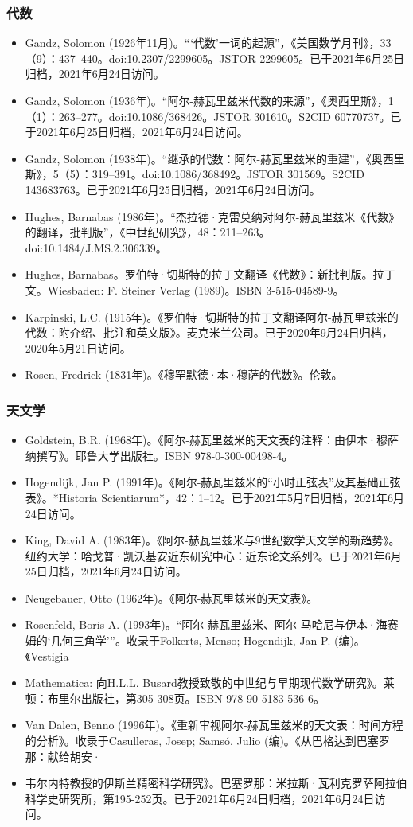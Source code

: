 \subsubsection{代数}  
\begin{itemize}
\item Gandz, Solomon (1926年11月)。“‘代数’一词的起源”，《美国数学月刊》，33（9）：437–440。doi:10.2307/2299605。JSTOR 2299605。已于2021年6月25日归档，2021年6月24日访问。  
\item Gandz, Solomon (1936年)。“阿尔-赫瓦里兹米代数的来源”，《奥西里斯》，1（1）：263–277。doi:10.1086/368426。JSTOR 301610。S2CID 60770737。已于2021年6月25日归档，2021年6月24日访问。  
\item Gandz, Solomon (1938年)。“继承的代数：阿尔-赫瓦里兹米的重建”，《奥西里斯》，5（5）：319–391。doi:10.1086/368492。JSTOR 301569。S2CID 143683763。已于2021年6月25日归档，2021年6月24日访问。  
\item Hughes, Barnabas (1986年)。“杰拉德·克雷莫纳对阿尔-赫瓦里兹米《代数》的翻译，批判版”，《中世纪研究》，48：211–263。doi:10.1484/J.MS.2.306339。  
\item Hughes, Barnabas。罗伯特·切斯特的拉丁文翻译《代数》：新批判版。拉丁文。Wiesbaden: F. Steiner Verlag (1989)。ISBN 3-515-04589-9。
\item Karpinski, L.C. (1915年)。《罗伯特·切斯特的拉丁文翻译阿尔-赫瓦里兹米的代数：附介绍、批注和英文版》。麦克米兰公司。已于2020年9月24日归档，2020年5月21日访问。  
\item Rosen, Fredrick (1831年)。《穆罕默德·本·穆萨的代数》。伦敦。
\end{itemize}
\subsubsection{天文学}  
\begin{itemize}
\item Goldstein, B.R. (1968年)。《阿尔-赫瓦里兹米的天文表的注释：由伊本·穆萨纳撰写》。耶鲁大学出版社。ISBN 978-0-300-00498-4。  
\item Hogendijk, Jan P. (1991年)。《阿尔-赫瓦里兹米的“小时正弦表”及其基础正弦表》。*Historia Scientiarum*，42：1–12。已于2021年5月7日归档，2021年6月24日访问。  
\item King, David A. (1983年)。《阿尔-赫瓦里兹米与9世纪数学天文学的新趋势》。纽约大学：哈戈普·凯沃基安近东研究中心：近东论文系列2。已于2021年6月25日归档，2021年6月24日访问。  
\item Neugebauer, Otto (1962年)。《阿尔-赫瓦里兹米的天文表》。  
\item Rosenfeld, Boris A. (1993年)。“阿尔-赫瓦里兹米、阿尔-马哈尼与伊本·海赛姆的‘几何三角学’”。收录于Folkerts, Menso; Hogendijk, Jan P. (编)。《Vestigia \item Mathematica: 向H.L.L. Busard教授致敬的中世纪与早期现代数学研究》。莱顿：布里尔出版社，第305-308页。ISBN 978-90-5183-536-6。  
\item Van Dalen, Benno (1996年)。《重新审视阿尔-赫瓦里兹米的天文表：时间方程的分析》。收录于Casulleras, Josep; Samsó, Julio (编)。《从巴格达到巴塞罗那：献给胡安·\item 韦尔内特教授的伊斯兰精密科学研究》。巴塞罗那：米拉斯·瓦利克罗萨阿拉伯科学史研究所，第195-252页。已于2021年6月24日归档，2021年6月24日访问。
\end{itemize}
